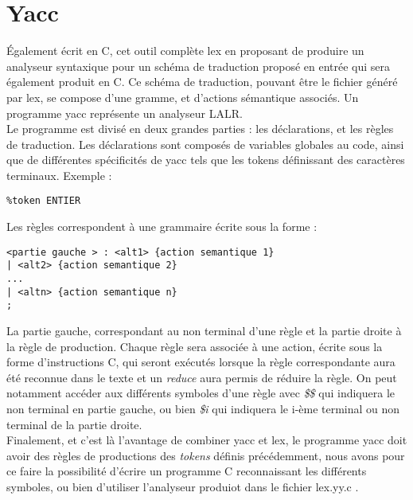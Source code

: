 \documentclass[a4paper,11pt]{article}
\newcommand{\br}{\\\mbox{}}
\begin{document}
\section{Yacc}
Également écrit en C, cet outil complète lex en proposant de produire un  analyseur syntaxique pour un schéma de traduction proposé en entrée qui sera également produit en C. Ce schéma de traduction, pouvant être le fichier généré par lex, se compose d'une gramme, et d'actions sémantique associés. Un programme yacc représente un analyseur LALR.\br
Le programme est divisé en deux grandes parties : les déclarations, et les règles de traduction. Les déclarations sont composés de variables globales au code, ainsi que de différentes spécificités de yacc tels que les tokens définissant des caractères terminaux. Exemple : 
\begin{lstlisting}
%token ENTIER
\end{lstlisting}
Les règles correspondent à une grammaire écrite sous la forme : 
\begin{lstlisting}
<partie gauche > : <alt1> {action semantique 1}
| <alt2> {action semantique 2}
...
| <altn> {action semantique n}
;
\end{lstlisting}
La partie gauche, correspondant au non terminal d'une règle et la partie droite à la règle de production. Chaque règle sera associée à une action, écrite sous la forme d'instructions C, qui seront exécutés lorsque la règle correspondante aura été reconnue dans le texte et un \textit{reduce} aura permis de réduire la règle. On peut notamment accéder aux différents symboles d'une règle avec \textit{\$\$} qui indiquera le non terminal en partie gauche, ou bien \textit{\$i} qui indiquera le i-ème terminal ou non terminal de la partie droite.\br
Finalement, et c'est là l'avantage de combiner yacc et lex, le programme yacc doit avoir des règles de productions des \textit{tokens} définis précédemment, nous avons pour ce faire la possibilité d'écrire un programme C reconnaissant les différents symboles, ou bien d'utiliser l'analyseur produiot dans le fichier lex.yy.c .

\pagebreak
\end{document}
